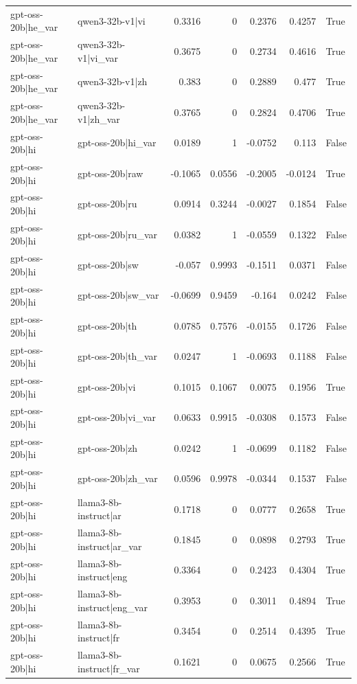 \begin{table}
\begin{tabular}{l l r r r r l}
gpt-oss-20b|he_var & qwen3-32b-v1|vi & 0.3316 & 0 & 0.2376 & 0.4257 & True \\
gpt-oss-20b|he_var & qwen3-32b-v1|vi_var & 0.3675 & 0 & 0.2734 & 0.4616 & True \\
gpt-oss-20b|he_var & qwen3-32b-v1|zh & 0.383 & 0 & 0.2889 & 0.477 & True \\
gpt-oss-20b|he_var & qwen3-32b-v1|zh_var & 0.3765 & 0 & 0.2824 & 0.4706 & True \\
gpt-oss-20b|hi & gpt-oss-20b|hi_var & 0.0189 & 1 & -0.0752 & 0.113 & False \\
gpt-oss-20b|hi & gpt-oss-20b|raw & -0.1065 & 0.0556 & -0.2005 & -0.0124 & True \\
gpt-oss-20b|hi & gpt-oss-20b|ru & 0.0914 & 0.3244 & -0.0027 & 0.1854 & False \\
gpt-oss-20b|hi & gpt-oss-20b|ru_var & 0.0382 & 1 & -0.0559 & 0.1322 & False \\
gpt-oss-20b|hi & gpt-oss-20b|sw & -0.057 & 0.9993 & -0.1511 & 0.0371 & False \\
gpt-oss-20b|hi & gpt-oss-20b|sw_var & -0.0699 & 0.9459 & -0.164 & 0.0242 & False \\
gpt-oss-20b|hi & gpt-oss-20b|th & 0.0785 & 0.7576 & -0.0155 & 0.1726 & False \\
gpt-oss-20b|hi & gpt-oss-20b|th_var & 0.0247 & 1 & -0.0693 & 0.1188 & False \\
gpt-oss-20b|hi & gpt-oss-20b|vi & 0.1015 & 0.1067 & 0.0075 & 0.1956 & True \\
gpt-oss-20b|hi & gpt-oss-20b|vi_var & 0.0633 & 0.9915 & -0.0308 & 0.1573 & False \\
gpt-oss-20b|hi & gpt-oss-20b|zh & 0.0242 & 1 & -0.0699 & 0.1182 & False \\
gpt-oss-20b|hi & gpt-oss-20b|zh_var & 0.0596 & 0.9978 & -0.0344 & 0.1537 & False \\
gpt-oss-20b|hi & llama3-8b-instruct|ar & 0.1718 & 0 & 0.0777 & 0.2658 & True \\
gpt-oss-20b|hi & llama3-8b-instruct|ar_var & 0.1845 & 0 & 0.0898 & 0.2793 & True \\
gpt-oss-20b|hi & llama3-8b-instruct|eng & 0.3364 & 0 & 0.2423 & 0.4304 & True \\
gpt-oss-20b|hi & llama3-8b-instruct|eng_var & 0.3953 & 0 & 0.3011 & 0.4894 & True \\
gpt-oss-20b|hi & llama3-8b-instruct|fr & 0.3454 & 0 & 0.2514 & 0.4395 & True \\
gpt-oss-20b|hi & llama3-8b-instruct|fr_var & 0.1621 & 0 & 0.0675 & 0.2566 & True \\

\end{tabular}
\end{table}
